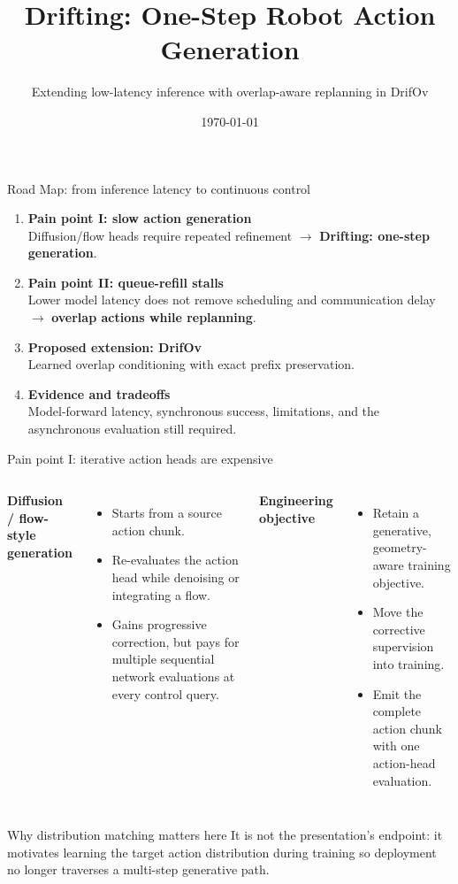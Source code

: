 \documentclass[aspectratio=169,10pt]{beamer}
\title{Drifting: One-Step Robot Action Generation}
\subtitle{Extending low-latency inference with overlap-aware replanning in DrifOv}
\date{\today}
\begin{document}
\maketitle

\begin{frame}{Road Map: from inference latency to continuous control}
  \begin{enumerate}
    \item \textbf{Pain point I: slow action generation}\\
          Diffusion/flow heads require repeated refinement
          $\rightarrow$ \textbf{Drifting: one-step generation}.
    \item \textbf{Pain point II: queue-refill stalls}\\
          Lower model latency does not remove scheduling and communication delay
          $\rightarrow$ \textbf{overlap actions while replanning}.
    \item \textbf{Proposed extension: DrifOv}\\
          Learned overlap conditioning with exact prefix preservation.
    \item \textbf{Evidence and tradeoffs}\\
          Model-forward latency, synchronous success, limitations, and the
          asynchronous evaluation still required.
  \end{enumerate}
\end{frame}

\begin{frame}{Pain point I: iterative action heads are expensive}
  \begin{columns}[T]
      \textbf{Diffusion / flow-style generation}
      \begin{itemize}
        \item Starts from a source action chunk.
        \item Re-evaluates the action head while denoising or integrating a flow.
        \item Gains progressive correction, but pays for multiple sequential
              network evaluations at every control query.
      \end{itemize}
      \textbf{Engineering objective}
      \begin{itemize}
        \item Retain a generative, geometry-aware training objective.
        \item Move the corrective supervision into training.
        \item Emit the complete action chunk with one action-head evaluation.
      \end{itemize}
  \end{columns}

  \vspace{0.5em}
  \begin{block}{Why distribution matching matters here}
    It is not the presentation's endpoint: it motivates learning the target
    action distribution during training so deployment no longer traverses a
    multi-step generative path.
  \end{block}
\end{frame}
\end{document}
